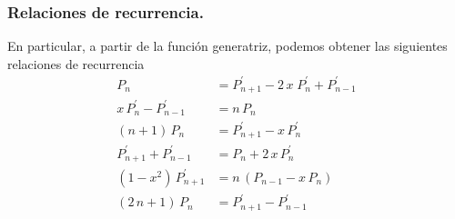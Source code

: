 \subsubsection*{Relaciones de recurrencia.}
En particular, a partir de la función generatriz, podemos obtener las siguientes relaciones de recurrencia
\begin{align*}
P_{n} &= P_{n+1}^{\prime} - 2 \, x \; P_{n}^{\prime} + P_{n-1}^{\prime} \\[1em]
x \, P_{n}^{\prime} - P_{n-1}^{\prime} &=  n \, P_{n} \\[1em]
(n + 1) \, P_{n} &= P_{n+1}^{\prime} - x \, P_{n}^{\prime} \\[1em]
P_{n+1}^{\prime} + P_{n-1}^{\prime} &=  P_{n} + 2 \, x \, P_{n}^{\prime} \\[1em]
(1 - x^{2}) \, P_{n+1}^{\prime} &= n \, (P_{n-1} - x \, P_{n}) \\[1em]
(2 \, n + 1) \, P_{n} &= P_{n+1}^{\prime} - P_{n-1}^{\prime}
\end{align*}

